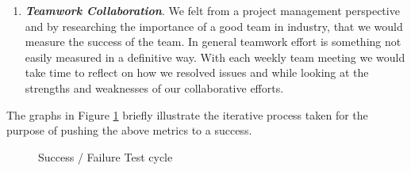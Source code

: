 \begin{enumerate}
  \item \textbf{\textit{Teamwork Collaboration}}. We felt from a project management perspective and by researching the importance of a good team in industry, that we would measure the success of the team. In general teamwork effort is something not easily measured in a definitive way. With each weekly team meeting we would take time to reflect on how we resolved issues and while looking at the strengths and weaknesses of our collaborative efforts. 

\end{enumerate}
 The graphs in Figure \ref{tikz:graphs} briefly illustrate the iterative process taken for the purpose of pushing the above metrics to a success.
 
\begin{figure}[H]
  \centering
  \caption{Success / Failure Test cycle}
  \label{tikz:graphs}
\end{figure}







